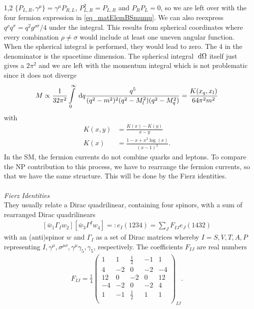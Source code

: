 \documentclass[11pt,a4paper,twoside]{article}
\numberwithin{equation}{section}
\begin{document}
\begin{spacing}{1,2}
$\{P_{L,R},\gamma^\mu\} = \gamma^\mu P_{R,L}$, $P_{L,R}^2 = P_{L,R}$ and $P_R P_L = 0$, so we are left over with the four fermion expression in 
\eqref{eq_matElemBSmumu}. We can also reexpress $q^\rho q^\sigma = q^2 g^{\rho\sigma}/4$ under the integral. This results from spherical coordinates where
every combination $\rho\neq\sigma$ would include at least one uneven angular function. When the spherical integral is performed, they would lead to zero. The 
4 in the denominator is the spacetime dimension. The spherical integral $\; \mathrm{d} \Omega$ itself just gives a $2\pi^2$ and we are left with the momentum integral
which is not problematic since it does not diverge
\begin{align}
 M \propto \frac{1}{32\pi^2} \int\limits_0^\infty \; \mathrm{d} q \frac{q^5}{(q^2-m^2)^2(q^2-M_l^2)(q^2-M_q^2)} = \frac{K(x_q,x_l)}{64\pi^2 m^2}
\end{align}
with
\begin{align}
 K(x,y) &= \frac{K(x)-K(y)}{x-y}\\
 K(x)&=\frac{1-x+x^2\log(x)}{(x-1)^2}.
\end{align}
In the SM, the fermion currents do not combine quarks and leptons. To compare the NP contribution to this process, we have to rearrange the fermion currents,
so that we have the same structure. This will be done by the Fierz identities.
\\ \\ \noindent \textit{Fierz Identities}\\
They usually relate a Dirac quadrilinear, containing four spinors, with a sum of rearranged Dirac quadrilinears \cite{Fierz}
\begin{align}
  \left[\bar w_1\Gamma_I w_2\right] \left[\bar w_3 \Gamma^I w_4 \right] =: e_I(1234) = \sum\limits_J F_{IJ} e_J(1432)
\end{align}
with an (anti)spinor $w$ and $\Gamma_I$ as a set of Dirac matrices whereby $I=S,V,T,A,P$ representing $I,\gamma^\mu,\sigma^{\mu\nu},\gamma^\mu\gamma_5,\gamma_5$, 
respectively. The coefficients $F_{IJ}$ are real numbers
\begin{align}
 F_{IJ}=\frac14\begin{pmatrix}
    1&1&\frac12&-1&1\\
    4&-2&0&-2&-4\\
    12&0&-2&0&12\\
    -4&-2&0&-2&4\\
    1&-1&\frac12&1&1\\
 \end{pmatrix}_{IJ}.
\end{align}

\end{spacing}
\end{document}

